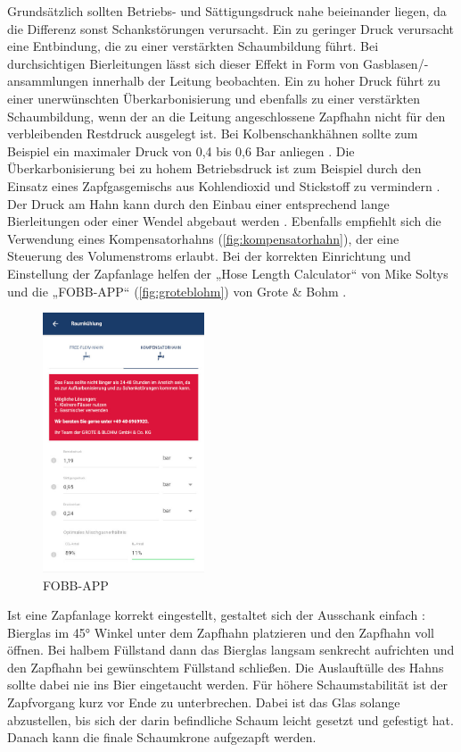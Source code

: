 \documentclass[a4paper,parskip=half]{scrartcl}
\begin{document}
Grundsätzlich sollten Betriebs- und Sättigungsdruck nahe beieinander liegen, da die Differenz sonst Schankstörungen verursacht. Ein zu geringer Druck verursacht eine  Entbindung, die zu einer verstärkten Schaumbildung führt. Bei durchsichtigen Bierleitungen lässt sich dieser Effekt in Form von Gasblasen/-ansammlungen innerhalb der Leitung beobachten. Ein zu hoher Druck führt zu einer unerwünschten Überkarbonisierung und ebenfalls zu einer verstärkten Schaumbildung, wenn der an die Leitung angeschlossene Zapfhahn nicht für den verbleibenden Restdruck ausgelegt ist. Bei Kolbenschankhähnen sollte zum Beispiel ein maximaler Druck von 0,4 bis 0,6 Bar anliegen \autocite{Krueger2015}. Die Überkarbonisierung bei zu hohem Betriebsdruck ist zum Beispiel durch den Einsatz eines Zapfgasgemischs aus Kohlendioxid und Stickstoff zu
vermindern \autocite{BrewersAssociation2019}. Der Druck am Hahn kann durch den Einbau einer entsprechend lange Bierleitungen oder einer Wendel abgebaut werden \autocite{Krueger2015}. Ebenfalls empfiehlt sich die Verwendung eines Kompensatorhahns (\autoref{fig:kompensatorhahn}), der eine Steuerung des Volumenstroms erlaubt. Bei der korrekten Einrichtung und Einstellung der Zapfanlage helfen der „Hose Length Calculator“ von Mike Soltys \autocite{Soltys2012} und die „FOBB-APP“ (\autoref{fig:groteblohm}) von Grote \& Bohm \autocite{GroteBlohm2020}.

\begin{figure}[h]
\centering
\includegraphics[width=4.8cm]{images/groteblohm.jpg}
\caption{FOBB-APP}
\label{fig:groteblohm}
\end{figure}

Ist eine Zapfanlage korrekt eingestellt, gestaltet sich der Ausschank einfach \autocite{BrewersAssociation2019}: Bierglas im 45° Winkel unter dem Zapfhahn platzieren und den Zapfhahn voll öffnen. Bei halbem Füllstand dann das Bierglas langsam senkrecht aufrichten und den Zapfhahn bei gewünschtem Füllstand schließen. Die Auslauftülle des Hahns sollte dabei nie ins Bier eingetaucht werden. Für höhere Schaumstabilität ist der Zapfvorgang kurz vor Ende zu unterbrechen. Dabei ist das Glas solange abzustellen, bis sich der darin befindliche Schaum leicht gesetzt und gefestigt hat. Danach kann die finale Schaumkrone aufgezapft werden.
\end{document}
